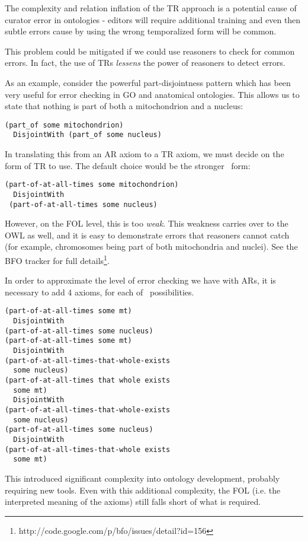 \documentclass{bioinfo}
\def\atAllTimes{\pr{at-all-times}}
\begin{document}
The complexity and relation inflation of the TR approach is a
potential cause of curator error in ontologies - editors will require
additional training and even then subtle errors cause by using the
wrong temporalized form will be common.

This problem could be mitigated if we could use reasoners to check for
common errors. In fact, the use of TRs \emph{lessens} the power of
reasoners to detect errors.

As an example, consider the powerful part-disjointness
pattern\cite{PD} which has been very useful for error checking in GO
and anatomical ontologies. This allows us to state that nothing is
part of both a mitochondrion and a nucleus:

\begin{verbatim}
(part_of some mitochondrion) 
  DisjointWith (part_of some nucleus)
\end{verbatim}

In translating this from an AR axiom to a TR axiom, we must decide on
the form of TR to use. The default choice would be the stronger
\atAllTimes\ form:

\begin{verbatim}
(part-of-at-all-times some mitochondrion) 
  DisjointWith
 (part-of-at-all-times some nucleus)
\end{verbatim}

However, on the FOL level, this is too \emph{weak}. This weakness
carries over to the OWL as well, and it is easy to demonstrate errors
that reasoners cannot catch (for example, chromosomes being part of
both mitochondria and nuclei). See the BFO tracker for
full details\footnote{http://code.google.com/p/bfo/issues/detail?id=156}.

In order to approximate the level of error checking we have with ARs,
it is necessary to add 4 axioms, for each of \atAllTimes\
possibilities.

\begin{verbatim}
(part-of-at-all-times some mt)
  DisjointWith
(part-of-at-all-times some nucleus)
(part-of-at-all-times some mt)
  DisjointWith
(part-of-at-all-times-that-whole-exists
  some nucleus)
(part-of-at-all-times that whole exists
  some mt)
  DisjointWith 
(part-of-at-all-times-that-whole-exists
  some nucleus)
(part-of-at-all-times some nucleus)
  DisjointWith
(part-of-at-all-times-that-whole exists
  some mt)
\end{verbatim}

This introduced significant complexity into ontology development,
probably requiring new tools. Even with this additional complexity,
the FOL (i.e. the interpreted meaning of the axioms) still falls short
of what is required.
\end{document}
